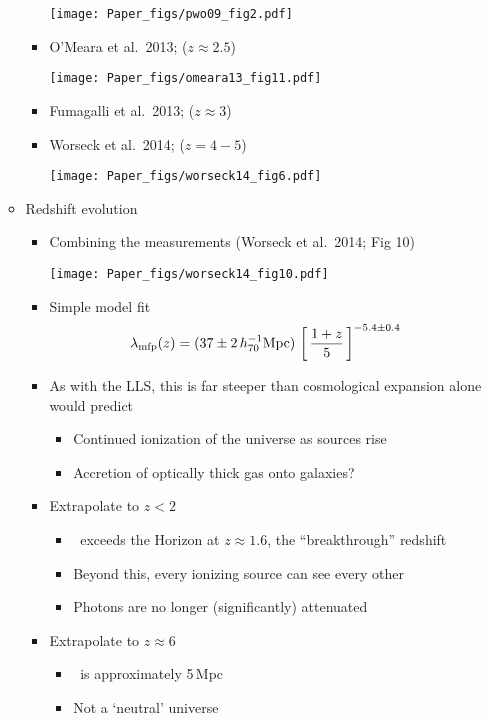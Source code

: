 \documentclass[12pt,letterpaper]{article}
\begin{document}
\begin{Aenumerate}
\begin{itemize}
\begin{itemize}
\begin{itemize}
\texttt{[image: Paper\_figs/pwo09\_fig2.pdf]}

  		\item O'Meara et al.\ 2013; ($z \approx 2.5$)

\texttt{[image: Paper\_figs/omeara13\_fig11.pdf]}

  		\item Fumagalli et al.\ 2013; ($z \approx 3$)
  		\item Worseck et al.\ 2014; ($z = 4-5$)

\texttt{[image: Paper\_figs/worseck14\_fig6.pdf]}
  		\end{itemize}

  	\item Redshift evolution

  		\begin{itemize}
  		\item Combining the measurements (Worseck et al.\ 2014; Fig 10)

\texttt{[image: Paper\_figs/worseck14\_fig10.pdf]}

		\item Simple model fit
		\begin{equation}
		\lambda_{\rm mfp}(z) = (37 \pm 2 \, h_{70}^{-1} {\rm Mpc})
		\, \left [ \, \frac{1+z}{5} \, \right ]^{-5.4 \pm 0.4}
		\end{equation}

		\item As with the LLS, this is far steeper than cosmological
		expansion alone would predict
			\begin{itemize}
			\item Continued ionization of the universe as sources rise
			\item Accretion of optically thick gas onto galaxies?
			\end{itemize}

		\item Extrapolate to $z<2$
			\begin{itemize}
			\item \lmfp\ exceeds the Horizon at $z \approx 1.6$, the
			``breakthrough'' redshift
			\item Beyond this, every ionizing source can see every other
			\item Photons are no longer (significantly) attenuated
			\end{itemize}
		\item Extrapolate to $z \approx 6$
			\begin{itemize}
			\item \lmfp\ is approximately 5\,Mpc
			\item Not a `neutral' universe
			\end{itemize}


\end{itemize}
\end{itemize}
\end{itemize}
\end{Aenumerate}
\end{document}
